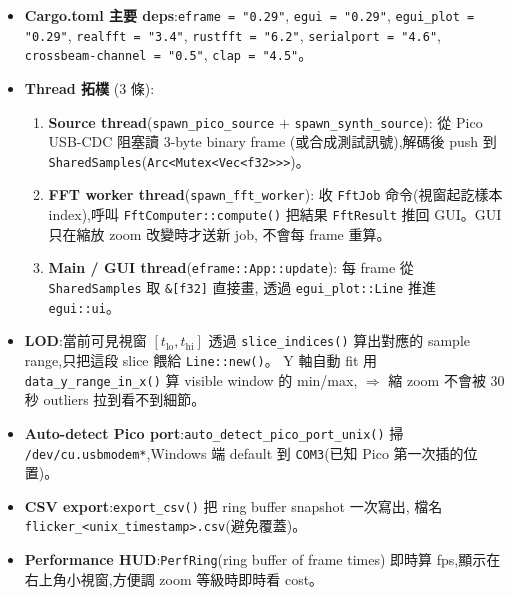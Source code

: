 \begin{itemize}[leftmargin=2em,itemsep=0pt]
  \item \textbf{Cargo.toml 主要 deps}:\texttt{eframe = "0.29"}, \texttt{egui = "0.29"},
        \texttt{egui\_plot = "0.29"}, \texttt{realfft = "3.4"}, \texttt{rustfft = "6.2"},
        \texttt{serialport = "4.6"}, \texttt{crossbeam-channel = "0.5"}, \texttt{clap = "4.5"}。
  \item \textbf{Thread 拓樸} (3 條):
        \begin{enumerate}[leftmargin=2em,itemsep=0pt]
          \item \textbf{Source thread}(\texttt{spawn\_pico\_source} \(+\) \texttt{spawn\_synth\_source}):
                從 Pico USB-CDC 阻塞讀 3-byte binary frame
                (或合成測試訊號),解碼後 push 到 \texttt{SharedSamples}(\texttt{Arc<Mutex<Vec<f32>>>})。
          \item \textbf{FFT worker thread}(\texttt{spawn\_fft\_worker}):
                收 \texttt{FftJob} 命令(視窗起訖樣本 index),呼叫 \texttt{FftComputer::compute()}
                把結果 \texttt{FftResult} 推回 GUI。GUI 只在縮放 zoom 改變時才送新 job,
                不會每 frame 重算。
          \item \textbf{Main / GUI thread}(\texttt{eframe::App::update}):
                每 frame 從 \texttt{SharedSamples} 取 \texttt{\&[f32]} 直接畫,
                透過 \texttt{egui\_plot::Line} 推進 \texttt{egui::ui}。
        \end{enumerate}
  \item \textbf{LOD}:當前可見視窗 \([t_\text{lo}, t_\text{hi}]\) 透過 \texttt{slice\_indices()}
        算出對應的 sample range,只把這段 slice 餵給 \texttt{Line::new()}。
        Y 軸自動 fit 用 \texttt{data\_y\_range\_in\_x()} 算 visible window 的 min/max,
        \(\Rightarrow\) 縮 zoom 不會被 30 秒 outliers 拉到看不到細節。
  \item \textbf{Auto-detect Pico port}:\texttt{auto\_detect\_pico\_port\_unix()} 掃
        \texttt{/dev/cu.usbmodem*},Windows 端 default 到 \texttt{COM3}(已知 Pico 第一次插的位置)。
  \item \textbf{CSV export}:\texttt{export\_csv()} 把 ring buffer snapshot 一次寫出,
        檔名 \texttt{flicker\_<unix\_timestamp>.csv}(避免覆蓋)。
  \item \textbf{Performance HUD}:\texttt{PerfRing}(ring buffer of frame times)
        即時算 fps,顯示在右上角小視窗,方便調 zoom 等級時即時看 cost。
\end{itemize}

